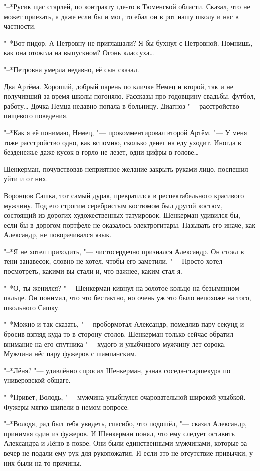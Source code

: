 "--*Русик щас старлей, по контракту где-то в Тюменской области.
Сказал, что не может приехать, а даже если бы и мог, то ебал он в рот нашу школу и нас в частности.

"--*Вот пидор.
А Петровну не приглашали?
Я бы бухнул с Петровной.
Помнишь, как она отожгла на выпускном?
Огонь классуха\ldots{}

"--*Петровна умерла недавно, её сын сказал.

Два Артёма.
Хороший, добрый парень по кличке Немец и второй, так и не получивший за время школы погоняло.
Рассказы про годовщину свадьбы, футбол, работу\ldots{}
Дочка Немца недавно попала в больницу.
Диагноз "--- расстройство пищевого поведения.

"--*Как я её понимаю, Немец, "--- прокомментировал второй Артём.
"--- У меня тоже расстройство одно, как вспомню, сколько денег на еду уходит.
Иногда в безденежье даже кусок в горло не лезет, одни цифры в голове\ldots{}

Шенкерман, почувствовав неприятное желание закрыть руками лицо, поспешил уйти и от них.

Воронцов Сашка, тот самый дурак, превратился в респектабельного красивого мужчину.
Под его строгим серебристым костюмом был другой костюм, состоящий из дорогих художественных татуировок.
Шенкерман удивился бы, если бы в дорогом портфеле не оказалось электрогитары.
Называть его иначе, как Александр, не поворачивался язык.

"--*Я не хотел приходить, "--- чистосердечно признался Александр.
Он стоял в тени занавесок, словно не хотел, чтобы его заметили.
"--- Просто хотел посмотреть, какими вы стали и, что важнее, каким стал я.

"--*О, ты женился? "--- Шенкерман кивнул на золотое кольцо на безымянном пальце.
Он понимал, что это бестактно, но очень уж это было непохоже на того, школьного Сашку.

"--*Можно и так сказать, "--- пробормотал Александр, помедлив пару секунд и бросив взгляд куда-то в сторону столов.
Шенкерман только сейчас обратил внимание на его спутника "--- худого и улыбчивого мужчину лет сорока.
Мужчина нёс пару фужеров с шампанским.

"--*Лёня? "--- удивлённо спросил Шенкерман, узнав соседа-старшекура по универовской общаге.

"--*Привет, Володь, "--- мужчина улыбнулся очаровательной широкой улыбкой.
Фужеры мягко шипели в немом вопросе.

"--*Володя, рад был тебя увидеть, спасибо, что подошёл, "--- сказал Александр, принимая один из фужеров.
И Шенкерман понял, что ему следует оставить Александра и Лёню в покое.
Они были единственными мужчинами, которые за вечер не подали ему рук для рукопожатия.
И если это не отсутствие привычки, у них были на то причины.

